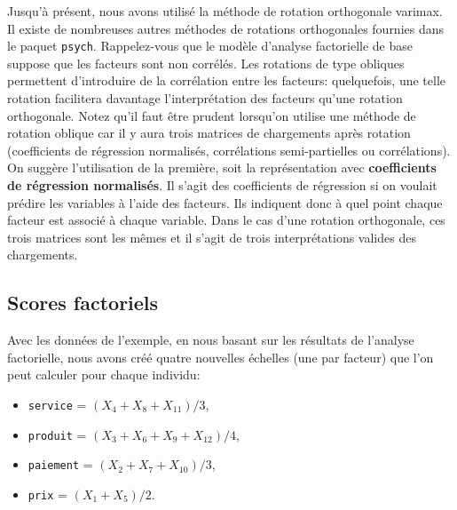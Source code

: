 \documentclass[
  11pt,
  letterpaper,
]{scrbook}
\providecommand{\tightlist}{%
  \setlength{\itemsep}{0pt}\setlength{\parskip}{0pt}}\usepackage{longtable,booktabs,array}
\theoremstyle{definition}
\theoremstyle{remark}
\begin{document}
Jusqu'à présent, nous avons utilisé la méthode de rotation orthogonale
varimax. Il existe de nombreuses autres méthodes de rotations
orthogonales fournies dans le paquet \texttt{psych}. Rappelez-vous que
le modèle d'analyse factorielle de base suppose que les facteurs sont
non corrélés. Les rotations de type obliques permettent d'introduire de
la corrélation entre les facteurs: quelquefois, une telle rotation
facilitera davantage l'interprétation des facteurs qu'une rotation
orthogonale. Notez qu'il faut être prudent lorsqu'on utilise une méthode
de rotation oblique car il y aura trois matrices de chargements après
rotation (coefficients de régression normalisés, corrélations
semi-partielles ou corrélations). On suggère l'utilisation de la
première, soit la représentation avec \textbf{coefficients de régression
normalisés}. Il s'agit des coefficients de régression si on voulait
prédire les variables à l'aide des facteurs. Ils indiquent donc à quel
point chaque facteur est associé à chaque variable. Dans le cas d'une
rotation orthogonale, ces trois matrices sont les mêmes et il s'agit de
trois interprétations valides des chargements.

\subsection{Scores factoriels}\label{scores-factoriels}

Avec les données de l'exemple, en nous basant sur les résultats de
l'analyse factorielle, nous avons créé quatre nouvelles échelles (une
par facteur) que l'on peut calculer pour chaque individu:

\begin{itemize}
\tightlist
\item
  \texttt{service} = \((X_4+X_8+X_{11})/3\),
\item
  \texttt{produit} = \((X_3+X_6+X_9+X_{12})/4\),
\item
  \texttt{paiement} = \((X_2+X_7+X_{10})/3\),
\item
  \texttt{prix} = \((X_1+X_5)/2\).
\end{itemize}
\end{document}
